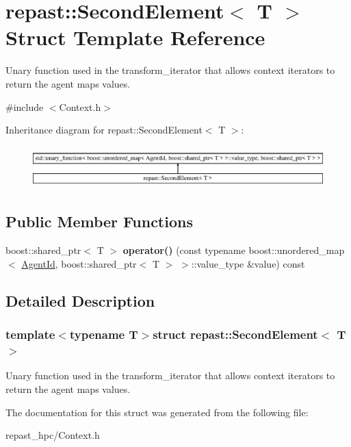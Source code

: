 \hypertarget{structrepast_1_1_second_element}{\section{repast\-:\-:Second\-Element$<$ T $>$ Struct Template Reference}
\label{structrepast_1_1_second_element}
}


Unary function used in the transform\-\_\-iterator that allows context iterators to return the agent maps values.  




{\ttfamily \#include $<$Context.\-h$>$}

Inheritance diagram for repast\-:\-:Second\-Element$<$ T $>$\-:\begin{figure}[H]
\begin{center}
\leavevmode
\includegraphics[height=1.635036cm]{structrepast_1_1_second_element}
\end{center}
\end{figure}
\subsection*{Public Member Functions}
\begin{DoxyCompactItemize}
\item 
\hypertarget{structrepast_1_1_second_element_abb240a7a393d6a8ed72b365159579e15}{boost\-::shared\-\_\-ptr$<$ T $>$ {\bfseries operator()} (const typename boost\-::unordered\-\_\-map$<$ \hyperlink{classrepast_1_1_agent_id}{Agent\-Id}, boost\-::shared\-\_\-ptr$<$ T $>$ $>$\-::value\-\_\-type \&value) const }\label{structrepast_1_1_second_element_abb240a7a393d6a8ed72b365159579e15}

\end{DoxyCompactItemize}


\subsection{Detailed Description}
\subsubsection*{template$<$typename T$>$struct repast\-::\-Second\-Element$<$ T $>$}

Unary function used in the transform\-\_\-iterator that allows context iterators to return the agent maps values. 

The documentation for this struct was generated from the following file\-:\begin{DoxyCompactItemize}
\item 
repast\-\_\-hpc/Context.\-h\end{DoxyCompactItemize}
